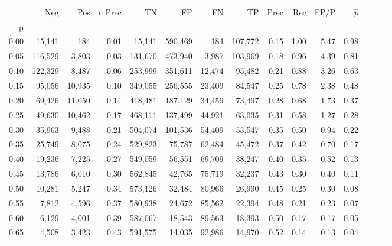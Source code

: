 \begin{tabular}{rrrrrrrrrrrrrrr}
\toprule
{} &      Neg &     Pos & mPrec &       TN &       FP &       FN &       TP &  Prec &   Rec &  FP/P & $\hat{p}$ \\
p    &          &         &       &          &          &          &          &       &       &       &           \\
\midrule
0.00 &   15,141 &     184 &  0.01 &   15,141 &  590,469 &      184 &  107,772 &  0.15 &  1.00 &  5.47 &      0.98 \\
0.05 &  116,529 &   3,803 &  0.03 &  131,670 &  473,940 &    3,987 &  103,969 &  0.18 &  0.96 &  4.39 &      0.81 \\
0.10 &  122,329 &   8,487 &  0.06 &  253,999 &  351,611 &   12,474 &   95,482 &  0.21 &  0.88 &  3.26 &      0.63 \\
0.15 &   95,056 &  10,935 &  0.10 &  349,055 &  256,555 &   23,409 &   84,547 &  0.25 &  0.78 &  2.38 &      0.48 \\
0.20 &   69,426 &  11,050 &  0.14 &  418,481 &  187,129 &   34,459 &   73,497 &  0.28 &  0.68 &  1.73 &      0.37 \\
0.25 &   49,630 &  10,462 &  0.17 &  468,111 &  137,499 &   44,921 &   63,035 &  0.31 &  0.58 &  1.27 &      0.28 \\
0.30 &   35,963 &   9,488 &  0.21 &  504,074 &  101,536 &   54,409 &   53,547 &  0.35 &  0.50 &  0.94 &      0.22 \\
0.35 &   25,749 &   8,075 &  0.24 &  529,823 &   75,787 &   62,484 &   45,472 &  0.37 &  0.42 &  0.70 &      0.17 \\
0.40 &   19,236 &   7,225 &  0.27 &  549,059 &   56,551 &   69,709 &   38,247 &  0.40 &  0.35 &  0.52 &      0.13 \\
0.45 &   13,786 &   6,010 &  0.30 &  562,845 &   42,765 &   75,719 &   32,237 &  0.43 &  0.30 &  0.40 &      0.11 \\
0.50 &   10,281 &   5,247 &  0.34 &  573,126 &   32,484 &   80,966 &   26,990 &  0.45 &  0.25 &  0.30 &      0.08 \\
0.55 &    7,812 &   4,596 &  0.37 &  580,938 &   24,672 &   85,562 &   22,394 &  0.48 &  0.21 &  0.23 &      0.07 \\
0.60 &    6,129 &   4,001 &  0.39 &  587,067 &   18,543 &   89,563 &   18,393 &  0.50 &  0.17 &  0.17 &      0.05 \\
0.65 &    4,508 &   3,423 &  0.43 &  591,575 &   14,035 &   92,986 &   14,970 &  0.52 &  0.14 &  0.13 &      0.04 \\

\end{tabular}

